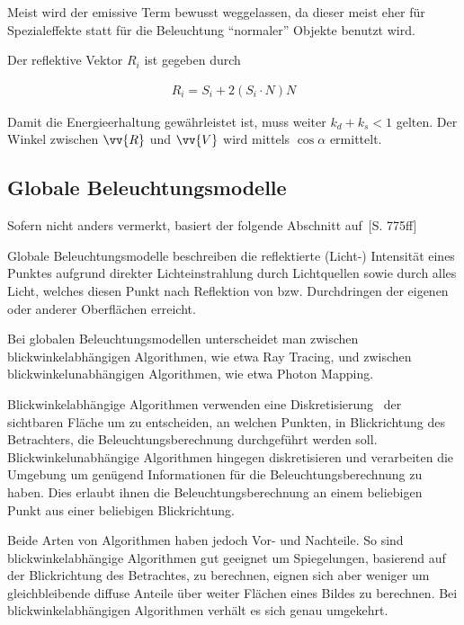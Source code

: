 Meist wird der emissive Term bewusst weggelassen, da dieser meist eher für
Spezialeffekte statt für die Beleuchtung ``normaler'' Objekte benutzt wird.

Der reflektive Vektor $R_{i}$ ist gegeben durch

\begin{gather}
    R_{i} = S_{i} + 2(S_{i} \cdot N)N
\end{gather}

Damit die Energieerhaltung gewährleistet ist, muss weiter $k_{d} + k_{s} < 1$
gelten. Der Winkel zwischen $\vv{R}$ und $\vv{V}$ wird mittels $\cos{\alpha}$
ermittelt.


\subsection{Globale Beleuchtungsmodelle}
\label{subsec:global_illumination_models}

Sofern nicht anders vermerkt, basiert der folgende Abschnitt auf~\cite{foley_computer_1996}[S. 775ff]

Globale Beleuchtungsmodelle beschreiben die reflektierte (Licht-) Intensität
eines Punktes aufgrund direkter Lichteinstrahlung durch Lichtquellen sowie
durch alles Licht, welches diesen Punkt nach Reflektion von bzw. Durchdringen
der eigenen oder anderer Oberflächen erreicht.

Bei globalen Beleuchtungsmodellen unterscheidet man zwischen
blickwinkelabhängigen Algorithmen, wie etwa Ray Tracing, und zwischen
blickwinkelunabhängigen Algorithmen, wie etwa Photon Mapping.

Blickwinkelabhängige Algorithmen verwenden eine Diskretisierung~ der sichtbaren Fläche um zu entscheiden, an welchen Punkten, in
Blickrichtung des Betrachters, die Beleuchtungsberechnung durchgeführt werden
soll. Blickwinkelunabhängige Algorithmen hingegen diskretisieren und
verarbeiten die Umgebung um genügend Informationen für die
Beleuchtungsberechnung zu haben. Dies erlaubt ihnen die Beleuchtungsberechnung
an einem beliebigen Punkt aus einer beliebigen Blickrichtung.

Beide Arten von Algorithmen haben jedoch Vor- und Nachteile. So sind
blickwinkelabhängige Algorithmen gut geeignet um Spiegelungen, basierend auf
der Blickrichtung des Betrachtes, zu berechnen, eignen sich aber weniger um
gleichbleibende diffuse Anteile über weiter Flächen eines Bildes zu berechnen.
Bei blickwinkelabhängigen Algorithmen verhält es sich genau umgekehrt.

